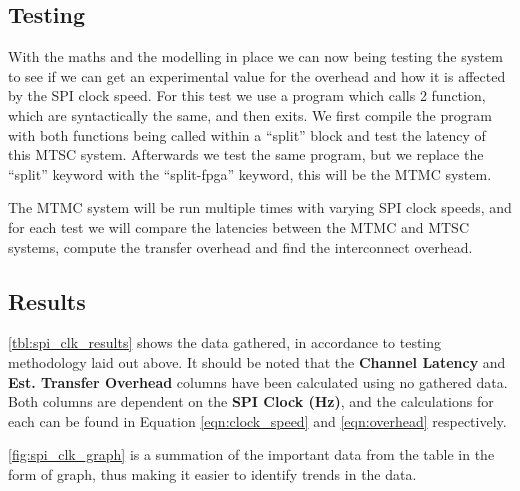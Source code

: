 \subsection{Testing}

With the maths and the modelling in place we can now being testing the system to see if we can get an experimental value for the overhead and how it is affected by the SPI clock speed. For this test we use a program which calls 2 function, which are syntactically the same, and then exits. We first compile the program with both functions being called within a “split” block and test the latency of this MTSC system. Afterwards we test the same program, but we replace the “split” keyword with the “split-fpga” keyword, this will be the MTMC system. 

The MTMC system will be run multiple times with varying SPI clock speeds, and for each test we will compare the latencies between the MTMC and MTSC systems, compute the transfer overhead and find the interconnect overhead.

\subsection{Results}

\autoref{tbl:spi_clk_results} shows the data gathered, in accordance to testing methodology laid out above. It should be noted that the \textbf{Channel Latency} and \textbf{Est. Transfer Overhead} columns have been calculated using no gathered data. Both columns are dependent on the \textbf{SPI Clock (Hz)}, and the calculations for each can be found in Equation \ref{eqn:clock_speed} and \ref{eqn:overhead} respectively.

\autoref{fig:spi_clk_graph} is a summation of the important data from the table in the form of graph, thus making it easier to identify trends in the data.

